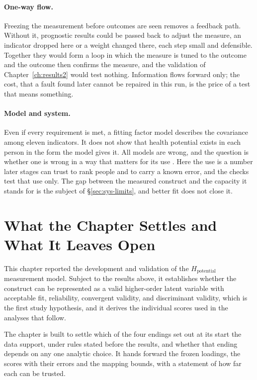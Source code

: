 \paragraph{One-way flow.} Freezing the measurement before outcomes are seen removes a feedback path. Without it, prognostic results could be passed back to adjust the measure, an indicator dropped here or a weight changed there, each step small and defensible. Together they would form a loop in which the measure is tuned to the outcome and the outcome then confirms the measure, and the validation of Chapter~\ref{ch:results2} would test nothing. Information flows forward only; the cost, that a fault found later cannot be repaired in this run, is the price of a test that means something.

\paragraph{Model and system.} Even if every requirement is met, a fitting factor model describes the covariance among eleven indicators. It does not show that health potential exists in each person in the form the model gives it. All models are wrong, and the question is whether one is wrong in a way that matters for its use \citep{box_1976}. Here the use is a number later stages can trust to rank people and to carry a known error, and the checks test that use only. The gap between the measured construct and the capacity it stands for is the subject of \S\ref{sec:sys-limits}, and better fit does not close it.

\section{What the Chapter Settles and What It Leaves Open}
This chapter reported the development and validation of the $H_{\text{potential}}$ measurement model. Subject to the results above, it establishes whether the construct can be represented as a valid higher-order latent variable with acceptable fit, reliability, convergent validity, and discriminant validity, which is the first study hypothesis, and it derives the individual scores used in the analyses that follow.

The chapter is built to settle which of the four endings set out at its start the data support, under rules stated before the results, and whether that ending depends on any one analytic choice. It hands forward the frozen loadings, the scores with their errors and the mapping bounds, with a statement of how far each can be trusted.


